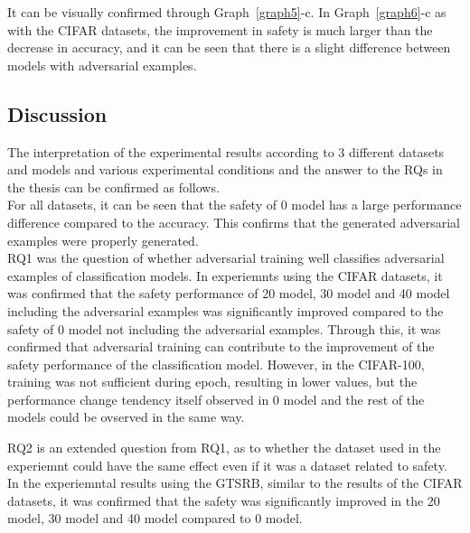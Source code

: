 \documentclass[journal,article,submit,moreauthors,pdftex]{Definitions/mdpi}
\begin{document}
It can be visually confirmed through Graph~\ref{graph5}-c.
In Graph~\ref{graph6}-c as with the CIFAR datasets, the improvement in safety is much larger than the decrease in accuracy, and it can be seen that there is a slight difference between models with adversarial examples.

\subsection{Discussion} %


The interpretation of the experimental results according to 3 different datasets and models and various experimental conditions and the answer to the RQs in the thesis can be confirmed as follows. \\

For all datasets, it can be seen that the safety of 0 model has a large performance difference compared to the accuracy. This confirms that the generated adversarial examples were properly generated. \\

RQ1 was the question of whether adversarial training well classifies adversarial examples of classification models.
In experiemnts using the CIFAR datasets, it was confirmed that the safety performance of 20 model, 30 model and 40 model including the adversarial examples was significantly improved compared to the safety of 0 model not including the adversarial examples.
Through this, it was confirmed that adversarial training can contribute to the improvement of the safety performance of the classification model.
However, in the CIFAR-100, training was not sufficient during epoch, resulting in lower values, but the performance change tendency itself observed in 0 model and the rest of the models could be ovserved in the same way.

RQ2 is an extended question from RQ1, as to whether the dataset used in the experiemnt could have the same effect even if it was a dataset related to safety.
In the experiemntal results using the GTSRB, similar to the results of the CIFAR datasets, it was confirmed that the safety was significantly improved in the 20 model, 30 model and 40 model compared to 0 model.
\end{document}
